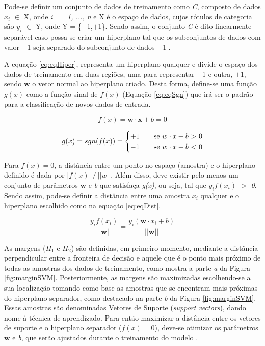 Pode-se definir um conjunto de dados de treinamento como \textit{C}, composto de dados \textit{$x_i$} $\in$ X, onde \textit{i $=$ 1, ..., n} e X é o espaço de dados, cujos rótulos de categoria são \textit{$y_i$} $\in$ Y, onde Y = \{$-$1,$+$1\}. Sendo assim, o conjunto \textit{C} é dito linearmente separável caso possa-se criar um hiperplano tal que os subconjuntos de dados com valor $-$1 seja separado do subconjunto de dados $+$1 .

A equação \ref{eq:eqHiper}, representa um hiperplano qualquer e divide o espaço dos dados de treinamento em duas regiões, uma para representar $-$1 e outra, $+$1, sendo $\boldsymbol{w}$ o vetor normal ao hiperplano criado. Desta forma, define-se uma função \textit{$g(x)$} como a função sinal de \textit{$f(x)$} (Equação \ref{eq:eqSgn}) que irá ser o padrão para a classificação de novos dados de entrada.

\begin{equation}
\label{eq:eqHiper}
 f(x)= \boldsymbol{w}\cdot \boldsymbol{x} + b = 0
\end{equation}

\begin{equation}
\label{eq:eqSgn}
 g(x) = sgn(f(x)) =
   \begin{cases}
    +1       & \quad \text{se } w\cdot x + b \text{ } $>$ \text{ } 0\\
    -1  & \quad \text{se } w\cdot x + b \text{ } $<$ \text{ } 0\\
   \end{cases}
\end{equation}

 Para $f(x) = 0$, a distância entre um ponto no espaço (amostra) e o hiperplano definido é dada por $|f(x)| \mathbin{/} ||w||$. Além disso, deve existir pelo menos um conjunto de parâmetros $\boldsymbol{w}$ e \textit{b} que satisfaça \textit{g(x)}, ou seja, tal que \textit{$y_i$$f(x_i)$ $>$ 0}. Sendo assim, pode-se definir a distância entre uma amostra $x_i$ qualquer e o hiperplano escolhido como na equação \ref{eq:eqDist}.

 \begin{equation}
\label{eq:eqDist}
  \frac{y_if(x_i)}{||\boldsymbol{w}||} = \frac{y_i(\boldsymbol{w} \cdot x_i + b)}{||\boldsymbol{w}||}
\end{equation}

As margens ($H_1$ e $H_2$) são definidas, em primeiro momento, mediante a distância perpendicular entre a fronteira de decisão e aquele que é o ponto mais próximo de todas as amostras dos dados de treinamento, como mostra a parte \textit{a} da Figura \ref{fig:marginSVM}. Posteriormente, as margens são maximizadas escolhendo-se a sua localização tomando como base as amostras que se encontram mais próximas do hiperplano separador, como destacado na parte \textit{b} da Figura \ref{fig:marginSVM}. Essas amostras são denominadas Vetores de Suporte (\textit{support vectors}), dando nome à técnica de aprendizado. Para então maximizar a distância entre os vetores de suporte e o hiperplano separador ($f(x) = 0$), deve-se otimizar os parâmetros $\boldsymbol{w}$ e \textit{b}, que serão ajustados durante o treinamento do modelo .

